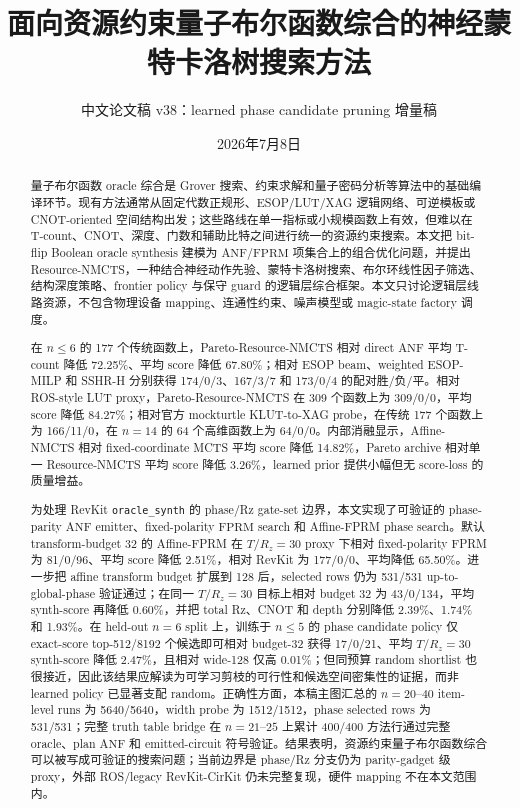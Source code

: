 \documentclass[UTF8,fontset=macnew,11pt]{ctexart}
\title{面向资源约束量子布尔函数综合的神经蒙特卡洛树搜索方法}
\author{中文论文稿 v38：learned phase candidate pruning 增量稿}
\date{2026年7月8日}
\newcommand{\method}{Resource-NMCTS}
\newcommand{\anf}{\ensuremath{\mathrm{ANF}}}
\newcommand{\fprm}{\ensuremath{\mathrm{FPRM}}}
\newcommand{\ttable}{truth table}
\begin{document}
\pagestyle{plain}
\maketitle

\begin{abstract}
量子布尔函数 oracle 综合是 Grover 搜索、约束求解和量子密码分析等算法中的基础编译环节。现有方法通常从固定代数正规形、ESOP/LUT/XAG 逻辑网络、可逆模板或 CNOT-oriented 空间结构出发；这些路线在单一指标或小规模函数上有效，但难以在 T-count、CNOT、深度、门数和辅助比特之间进行统一的资源约束搜索。本文把 bit-flip Boolean oracle synthesis 建模为 \anf{}/\fprm{} 项集合上的组合优化问题，并提出 \method{}，一种结合神经动作先验、蒙特卡洛树搜索、布尔环线性因子筛选、结构深度策略、frontier policy 与保守 guard 的逻辑层综合框架。本文只讨论逻辑层线路资源，不包含物理设备 mapping、连通性约束、噪声模型或 magic-state factory 调度。

在 $n\leq6$ 的 177 个传统函数上，Pareto-\method{} 相对 direct \anf{} 平均 T-count 降低 72.25\%、平均 score 降低 67.80\%；相对 ESOP beam、weighted ESOP-MILP 和 SSHR-H 分别获得 174/0/3、167/3/7 和 173/0/4 的配对胜/负/平。相对 ROS-style LUT proxy，Pareto-\method{} 在 309 个函数上为 309/0/0，平均 score 降低 84.27\%；相对官方 mockturtle KLUT-to-XAG probe，在传统 177 个函数上为 166/11/0，在 $n=14$ 的 64 个高维函数上为 64/0/0。内部消融显示，Affine-NMCTS 相对 fixed-coordinate MCTS 平均 score 降低 14.82\%，Pareto archive 相对单一 \method{} 平均 score 降低 3.26\%，learned prior 提供小幅但无 score-loss 的质量增益。

为处理 RevKit \texttt{oracle\_synth} 的 phase/Rz gate-set 边界，本文实现了可验证的 phase-parity \anf{} emitter、fixed-polarity \fprm{} search 和 Affine-FPRM phase search。默认 transform-budget 32 的 Affine-FPRM 在 $T/R_z=30$ proxy 下相对 fixed-polarity FPRM 为 81/0/96、平均 score 降低 2.51\%，相对 RevKit 为 177/0/0、平均降低 65.50\%。进一步把 affine transform budget 扩展到 128 后，selected rows 仍为 531/531 up-to-global-phase 验证通过；在同一 $T/R_z=30$ 目标上相对 budget 32 为 43/0/134，平均 synth-score 再降低 0.60\%，并把 total Rz、CNOT 和 depth 分别降低 2.39\%、1.74\% 和 1.93\%。在 held-out $n=6$ split 上，训练于 $n\leq5$ 的 phase candidate policy 仅 exact-score top-512/8192 个候选即可相对 budget-32 获得 17/0/21、平均 $T/R_z=30$ synth-score 降低 2.47\%，且相对 wide-128 仅高 0.01\%；但同预算 random shortlist 也很接近，因此该结果应解读为可学习剪枝的可行性和候选空间密集性的证据，而非 learned policy 已显著支配 random。正确性方面，本稿主图汇总的 $n=20$--$40$ item-level runs 为 5640/5640，width probe 为 1512/1512，phase selected rows 为 531/531；完整 \ttable{} bridge 在 $n=21$--$25$ 上累计 400/400 方法行通过完整 oracle、plan \anf{} 和 emitted-circuit 符号验证。结果表明，资源约束量子布尔函数综合可以被写成可验证的搜索问题；当前边界是 phase/Rz 分支仍为 parity-gadget 级 proxy，外部 ROS/legacy RevKit-CirKit 仍未完整复现，硬件 mapping 不在本文范围内。
\end{abstract}
\end{document}
